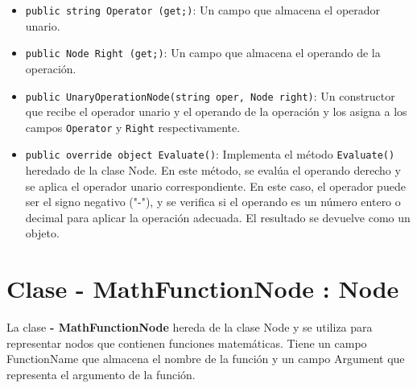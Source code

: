 \documentclass{article}
\newcommand{\subclassed}[1]{\textcolor{classcolor}{\textbf{- #1}}}
\begin{document}
\begin{itemize}
    \item \lstinline{public string Operator (get;)}: Un campo que almacena el operador unario.

    \item \lstinline{public Node Right (get;)}: Un campo que almacena el operando de la operación.

    \item \lstinline{public UnaryOperationNode(string oper, Node right)}: Un constructor que recibe el operador unario y el operando de la operación y los asigna a los campos \lstinline{Operator} y \lstinline{Right} respectivamente.

    \item \lstinline{public override object Evaluate()}: Implementa el método \lstinline{Evaluate()} heredado de la clase \textcolor{classcolor}{Node}. En este método, se evalúa el operando derecho y se aplica el operador unario correspondiente. En este caso, el operador puede ser el signo negativo ("-"), y se verifica si el operando es un número entero o decimal para aplicar la operación adecuada. El resultado se devuelve como un objeto.
\end{itemize}
\section{Clase \subclassed{MathFunctionNode} : Node}

La clase \subclassed{MathFunctionNode} hereda de la clase \textcolor{classcolor}{Node} y se utiliza para representar nodos que contienen funciones matemáticas. Tiene un campo \textcolor{fieldcolor}{FunctionName} que almacena el nombre de la función y un campo \textcolor{fieldcolor}{Argument} que representa el argumento de la función.
\end{document}
